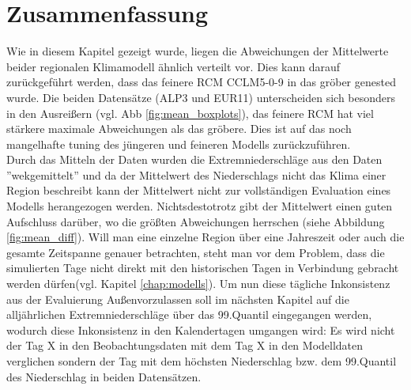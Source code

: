 \section{Zusammenfassung}\label{sec:zusammenfassung_01}
Wie in diesem Kapitel gezeigt wurde, liegen die Abweichungen der Mittelwerte beider regionalen Klimamodell ähnlich verteilt vor. Dies kann darauf zurückgeführt werden, dass das feinere RCM CCLM5-0-9 in das gröber genested wurde. Die beiden Datensätze (ALP3 und EUR11) unterscheiden sich besonders in den Ausreißern (vgl. Abb \ref{fig:mean_boxplots}), das feinere RCM hat viel stärkere maximale Abweichungen als das gröbere. Dies ist auf das noch mangelhafte tuning des jüngeren und feineren Modells zurückzuführen.\\
Durch das Mitteln der Daten wurden die Extremniederschläge aus den Daten ''wekgemittelt'' und da der Mittelwert des Niederschlags nicht das Klima einer Region beschreibt kann der Mittelwert nicht zur vollständigen Evaluation eines Modells herangezogen werden. Nichtsdestotrotz gibt der Mittelwert einen guten Aufschluss darüber, wo die größten Abweichungen herrschen (siehe Abbildung \ref{fig:mean_diff}). Will man eine einzelne Region über eine Jahreszeit oder auch die gesamte Zeitspanne genauer betrachten, steht man vor dem Problem, dass die simulierten Tage nicht direkt mit den historischen Tagen in Verbindung gebracht werden dürfen(vgl. Kapitel \ref{chap:modells}). Um nun diese tägliche Inkonsistenz aus der Evaluierung Außenvorzulassen soll im nächsten Kapitel auf die alljährlichen Extremniederschläge über das 99.Quantil eingegangen werden, wodurch diese Inkonsistenz in den Kalendertagen umgangen wird: Es wird nicht der Tag X in den Beobachtungsdaten mit dem Tag X in den Modelldaten verglichen sondern der Tag mit dem höchsten Niederschlag bzw. dem 99.Quantil des Niederschlag in beiden Datensätzen.
